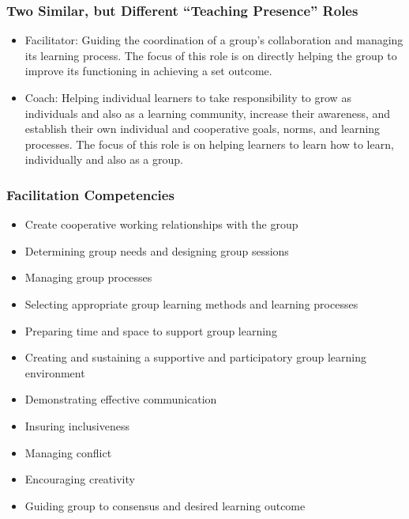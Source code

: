 \documentclass[
]{book}
\providecommand{\tightlist}{%
  \setlength{\itemsep}{0pt}\setlength{\parskip}{0pt}}
\begin{document}
\hypertarget{two-similar-but-different-teaching-presence-roles}{%
\subsubsection*{Two Similar, but Different ``Teaching Presence'' Roles}\label{two-similar-but-different-teaching-presence-roles}}

\begin{itemize}
\tightlist
\item
  Facilitator: Guiding the coordination of a group's collaboration and managing its learning process. The focus of this role is on directly helping the group to improve its functioning in achieving a set outcome.
\item
  Coach: Helping individual learners to take responsibility to grow as individuals and also as a learning community, increase their awareness, and establish their own individual and cooperative goals, norms, and learning processes. The focus of this role is on helping learners to learn how to learn, individually and also as a group.
\end{itemize}

\hypertarget{facilitation-competencies}{%
\subsubsection*{Facilitation Competencies}\label{facilitation-competencies}}

\begin{itemize}
\tightlist
\item
  Create cooperative working relationships with the group
\item
  Determining group needs and designing group sessions
\item
  Managing group processes
\item
  Selecting appropriate group learning methods and learning processes
\item
  Preparing time and space to support group learning
\item
  Creating and sustaining a supportive and participatory group learning environment
\item
  Demonstrating effective communication
\item
  Insuring inclusiveness
\item
  Managing conflict
\item
  Encouraging creativity
\item
  Guiding group to consensus and desired learning outcome
\end{itemize}
\end{document}
